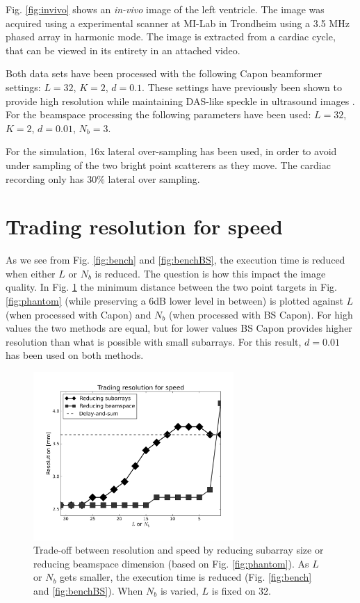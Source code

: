 \documentclass[12pt,journal,onecolumn]{IEEEtran}
\begin{document}
Fig. \ref{fig:invivo} shows an \textit{in-vivo} image of the left ventricle. The image was acquired using a experimental scanner at MI-Lab in Trondheim using a 3.5 MHz phased array in harmonic mode. The image is extracted from a cardiac cycle, that can be viewed in its entirety in an attached video. 

Both data sets have been processed with the following Capon beamformer settings: $L = 32$, $K = 2$, $d=0.1$. These settings have previously been shown to provide high resolution while maintaining DAS-like speckle in ultrasound images \cite{Synnevag2007a}. For the beamspace processing the following parameters have been used: $L=32$, $K=2$, $d=0.01$, $N_b=3$.

For the simulation, 16x lateral over-sampling has been used, in order to avoid under sampling of the two bright point scatterers as they move. The cardiac recording only has $30\%$ lateral over sampling.

\section{Trading resolution for speed}
As we see from Fig. \ref{fig:bench} and \ref{fig:benchBS}, the execution time is reduced when either $L$ or $N_b$ is reduced. The question is how this impact the image quality. In Fig. \ref{fig:speed_res_trade} the minimum distance between the two point targets in Fig. \ref{fig:phantom} (while preserving a 6dB lower level in between) is plotted against $L$ (when processed with Capon) and $N_b$ (when processed with BS Capon). For high values the two methods are equal, but for lower values BS Capon provides higher resolution than what is possible with small subarrays. For this result, $d=0.01$ has been used on both methods.

\begin{figure}
\centering
\includegraphics[width=3in]{gfx/speed_res_trade.png}
\caption{Trade-off between resolution and speed by reducing subarray size or reducing beamspace dimension (based on Fig. \ref{fig:phantom}). As $L$ or $N_b$ gets smaller, the execution time is reduced (Fig. \ref{fig:bench} and \ref{fig:benchBS}). When $N_b$ is varied, $L$ is fixed on 32.}
\label{fig:speed_res_trade}
\end{figure}
\end{document}
